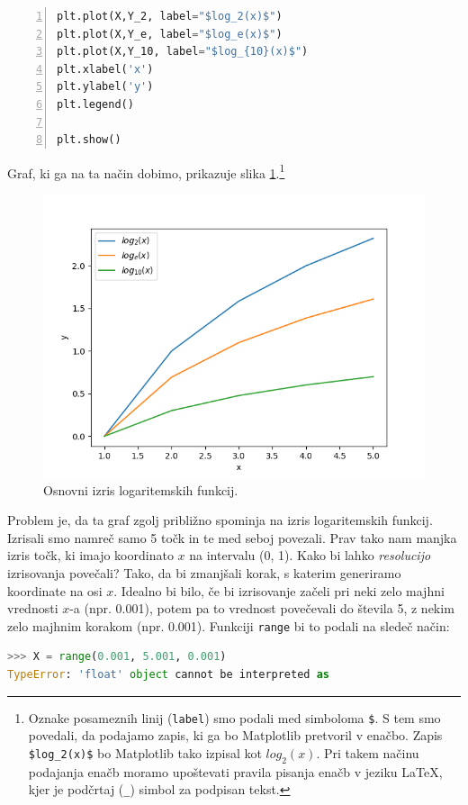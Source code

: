 \begin{resitev}
\begin{lstlisting}[language=Python,numbers=left,escapechar=~]
plt.plot(X,Y_2, label="$log_2(x)$")
plt.plot(X,Y_e, label="$log_e(x)$")
plt.plot(X,Y_10, label="$log_{10}(x)$")
plt.xlabel('x')
plt.ylabel('y')
plt.legend()

plt.show()
\end{lstlisting}
Graf, ki ga na ta način dobimo, prikazuje slika \ref{img:plt8}.\footnote{Oznake posameznih linij (\texttt{label}) smo podali med simboloma \texttt{\$}. S tem smo povedali, da podajamo zapis, ki ga bo Matplotlib pretvoril v enačbo. Zapis \texttt{\$log\_2(x)\$} bo Matplotlib tako izpisal kot $log_2(x)$. Pri takem načinu podajanja enačb moramo upoštevati pravila pisanja enačb v jeziku LaTeX, kjer je podčrtaj (\texttt{\_}) simbol za podpisan tekst.} 
\begin{figure}
    \includegraphics[width=\linewidth]{img/plt8.png}
    \caption{Osnovni izris logaritemskih funkcij.}
    \label{img:plt8}
\end{figure}
Problem je, da ta graf zgolj približno spominja na izris logaritemskih funkcij. Izrisali smo namreč samo 5 točk in te med seboj povezali. Prav tako nam manjka izris točk, ki imajo koordinato $x$ na intervalu (0, 1). Kako bi lahko \emph{resolucijo} izrisovanja povečali? Tako, da bi zmanjšali korak, s katerim generiramo koordinate na osi $x$. Idealno bi bilo, če bi izrisovanje začeli pri neki zelo majhni vrednosti $x$-a (npr. 0.001), potem pa to vrednost povečevali do števila 5, z nekim zelo majhnim korakom (npr. 0.001). Funkciji \texttt{range} bi to podali na sledeč način:
\begin{lstlisting}[language=Python]
>>> X = range(0.001, 5.001, 0.001)
TypeError: 'float' object cannot be interpreted as 

\end{lstlisting}
\end{resitev}
